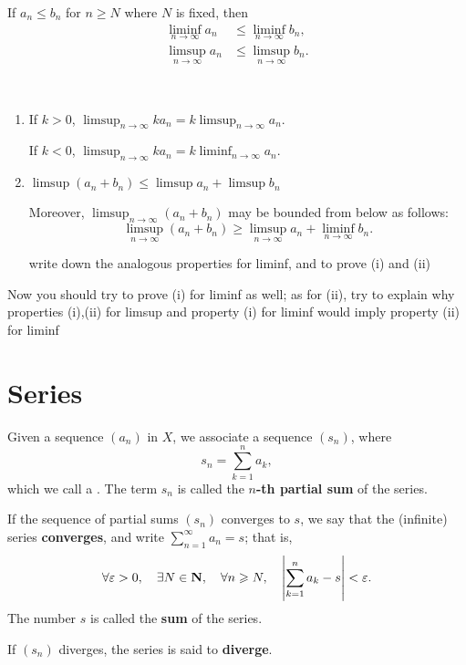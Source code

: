 \begin{proposition}\label{prop:limsup-liminf-comp}
If $a_n\le b_n$ for $n\ge N$ where $N$ is fixed, then
\begin{align*}
\liminf_{n\to\infty}a_n&\le\liminf_{n\to\infty}b_n,\\
\limsup_{n\to\infty}a_n&\le\limsup_{n\to\infty}b_n.
\end{align*}
\end{proposition}

\begin{proposition} \
\begin{enumerate}[label=(\roman*)]
\item If $k>0$, $\displaystyle\limsup_{n\to\infty}ka_n=k\limsup_{n\to\infty}a_n$.

If $k<0$, $\displaystyle\limsup_{n\to\infty}ka_n=k\liminf_{n\to\infty}a_n$.

\item $\displaystyle\limsup(a_n+b_n)\le\limsup a_n+\limsup b_n$

Moreover, $\displaystyle\limsup_{n\to\infty}(a_n+b_n)$ may be bounded from below as follows:
\[ \limsup_{n\to\infty}(a_n+b_n)\ge\limsup_{n\to\infty}a_n+\liminf_{n\to\infty}b_n.\]

write down the analogous properties for liminf, and to prove (i) and (ii)
\end{enumerate}
\end{proposition}

Now you should try to prove (i) for liminf as well; as for (ii), try to explain why properties (i),(ii) for limsup and property (i) for liminf would imply property (ii) for liminf

\section{Series}
\begin{definition}[Series]
Given a sequence $(a_n)$ in $X$, we associate a sequence $(s_n)$, where
\[s_n=\sum_{k=1}^n a_k,\]
which we call a . The term $s_n$ is called the \textbf{$n$-th partial sum} of the series.

If the sequence of partial sums $(s_n)$ converges to $s$, we say that the (infinite) series \textbf{converges}, and write $\displaystyle\sum_{n=1}^\infty a_n=s$; that is,
\[\forall\varepsilon>0,\quad\exists N\in\mathbf N,\quad\forall n\geqslant N,\quad\left|\sum_{k=1}^n a_k-s\right|<\varepsilon.\]
The number $s$ is called the \textbf{sum} of the series.

If $(s_n)$ diverges, the series is said to \textbf{diverge}.
\end{definition}


